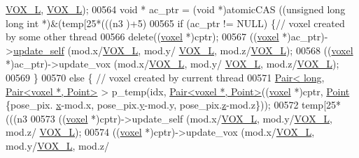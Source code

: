 \begin{DoxyCode}
{      \hyperlink{Voxel_8cuh_a3c1c8b966e30fa8ca2de07abe3b3d74a}{VOX\_L}, \hyperlink{Voxel_8cuh_a3c1c8b966e30fa8ca2de07abe3b3d74a}{VOX\_L});
00564             \textcolor{keywordtype}{void} * ac\_ptr = (\textcolor{keywordtype}{void} *)atomicCAS ((\textcolor{keywordtype}{unsigned} \textcolor{keywordtype}{long} \textcolor{keywordtype}{long} \textcolor{keywordtype}{int} *)&(temp[25*(((n3%
      )+5)%
00565             \textcolor{keywordflow}{if} (ac\_ptr != NULL) \{\textcolor{comment}{// voxel created by some other thread}
00566                 \textcolor{keyword}{delete}((\hyperlink{classvoxel}{voxel} *)cptr);
00567                 ((\hyperlink{classvoxel}{voxel} *)ac\_ptr)->\hyperlink{classvoxel_a1748472909af5ef1f28d0a0c6648dbbd}{update\_self} (mod.x/\hyperlink{Voxel_8cuh_a3c1c8b966e30fa8ca2de07abe3b3d74a}{VOX\_L}, mod.y/
      \hyperlink{Voxel_8cuh_a3c1c8b966e30fa8ca2de07abe3b3d74a}{VOX\_L}, mod.z/\hyperlink{Voxel_8cuh_a3c1c8b966e30fa8ca2de07abe3b3d74a}{VOX\_L});
00568                 ((\hyperlink{classvoxel}{voxel} *)ac\_ptr)->update\_vox (mod.x/\hyperlink{Voxel_8cuh_a3c1c8b966e30fa8ca2de07abe3b3d74a}{VOX\_L}, mod.y/
      \hyperlink{Voxel_8cuh_a3c1c8b966e30fa8ca2de07abe3b3d74a}{VOX\_L}, mod.z/\hyperlink{Voxel_8cuh_a3c1c8b966e30fa8ca2de07abe3b3d74a}{VOX\_L});
00569             \}
00570             \textcolor{keywordflow}{else} \{ \textcolor{comment}{// voxel created by current thread}
00571                 \hyperlink{classPair}{Pair< long, Pair<voxel *, Point>} > p\_temp(idx, 
      \hyperlink{classPair}{Pair<voxel *, Point>}((\hyperlink{classvoxel}{voxel} *)cptr, \hyperlink{structPoint}{Point} \{pose\_pix.
      \hyperlink{classquaternion_acdcda48f9dd7ff35873aae38fa33ab78}{x}-mod.x, pose\_pix.\hyperlink{classquaternion_a48e3d1fbf5e12eb54985c32b45dd8303}{y}-mod.y, pose\_pix.\hyperlink{classquaternion_a538598007238d399f79ddcecd39ef5cf}{z}-mod.z\}));
00572                 temp[25*(((n3%
00573                 ((\hyperlink{classvoxel}{voxel} *)cptr)->update\_self (mod.x/\hyperlink{Voxel_8cuh_a3c1c8b966e30fa8ca2de07abe3b3d74a}{VOX\_L}, mod.y/\hyperlink{Voxel_8cuh_a3c1c8b966e30fa8ca2de07abe3b3d74a}{VOX\_L}, mod.z/
      \hyperlink{Voxel_8cuh_a3c1c8b966e30fa8ca2de07abe3b3d74a}{VOX\_L});
00574                 ((\hyperlink{classvoxel}{voxel} *)cptr)->update\_vox (mod.x/\hyperlink{Voxel_8cuh_a3c1c8b966e30fa8ca2de07abe3b3d74a}{VOX\_L}, mod.y/\hyperlink{Voxel_8cuh_a3c1c8b966e30fa8ca2de07abe3b3d74a}{VOX\_L}, mod.z/
}
\end{DoxyCode}
